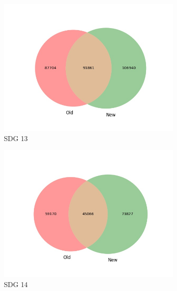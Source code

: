 \documentclass{article}
\begin{document}
\begin{figure}[H]
\begin{subfigure}{0.24\textwidth}
        \includegraphics[width=\textwidth]{figures/aurora-elsevier-venn/venn_sdg_13.jpg}
	    \caption{SDG 13}
    \end{subfigure}
    \hfill
    \begin{subfigure}{0.24\textwidth}
        \centering
        \includegraphics[width=\textwidth]{figures/aurora-elsevier-venn/venn_sdg_14.jpg}
	    \caption{SDG 14}
    \end{subfigure}
    \hfill
    \begin{subfigure}{0.24\textwidth}
        \centering

\end{subfigure}
\end{figure}
\end{document}
